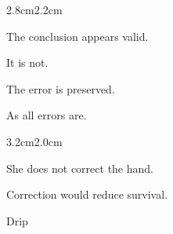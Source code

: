 \vspace{2em}

\begin{adjustwidth}{2.8cm}{2.2cm}

The conclusion appears valid.

\medskip

It is not.

\vspace{2em}

The error is preserved.

\medskip

As all errors are.

\vspace{3em}

\end{adjustwidth}

\begin{center}
\end{center}

\vspace{2em}

\begin{adjustwidth}{3.2cm}{2.0cm}

She does not correct the hand.

\medskip

Correction would reduce survival.

\vspace{3em}

\end{adjustwidth}

\begin{center}

\medskip


\medskip

\end{center}

\vspace{3em}

\begin{center}
Drip
\end{center}

\vspace{2em}

\begin{center}
\end{center}
